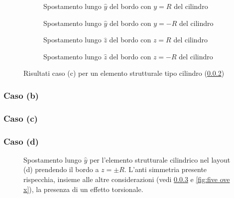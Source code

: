 \documentclass[a4paper,num-refs]{oup-contemporary}
\begin{document}
\begin{figure}[bt!]
			\centering
	\begin{subfigure}[t]{0.23\textwidth}
		\centering
		\caption{Spostamento lungo $\hat y$ del bordo con $y=R$ del cilindro}
		
	\end{subfigure}
	\hfill
	\begin{subfigure}[t]{0.23\textwidth}
		\centering
		
		\caption{Spostamento lungo $\hat y$ del bordo con $y=-R$ del cilindro}
		
	\end{subfigure}
	\hfill
	\begin{subfigure}[t]{0.23\textwidth}
		\centering
		\caption{Spostamento lungo $\hat z$ del bordo con $z=R$ del cilindro}
	\end{subfigure}
	\hfill
	\begin{subfigure}[t]{0.23\textwidth}
		\centering
		\caption{Spostamento lungo $\hat z$ del bordo con $z=-R$ del cilindro}
	\end{subfigure}
	\hfill
	\caption{Risultati caso (c) per un elemento strutturale tipo cilindro (\cref{sec:cyl_C})}
	\label{fig:cyl_C}
	
\end{figure}

\textcolor{blue}{\lipsum[1-2]}
\subsubsection{Caso (b)}
\label{sec:cyl_B}
\textcolor{blue}{\lipsum[1-2]}
\subsubsection{Caso (c)}
\label{sec:cyl_C}
\textcolor{blue}{\lipsum[1-2]}
\subsubsection{Caso (d)}
\label{sec:cyl_D}

\begin{figure}
	\def\svgwidth{\linewidth}
	
	\caption{Spostamento lungo $\hat y$ per l'elemento strutturale cilindrico nel layout (d) prendendo il bordo a $z=\pm R$. L'anti simmetria presente rispecchia, insieme alle altre considerazioni (vedi \cref{sec:cyl_D} e \cref{fig:five ove x}), la presenza di un effetto torsionale.}
\label{fig:D_extra}
\end{figure}
\end{document}
